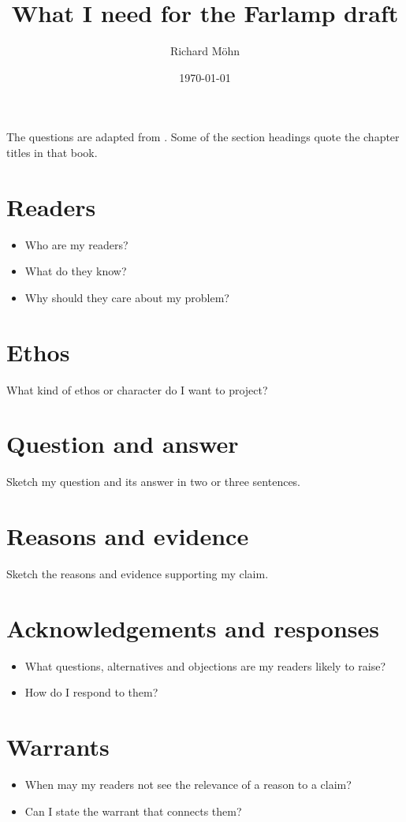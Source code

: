 \documentclass{farlamp}
\title{What I need for the Farlamp draft}
\author{Richard Möhn}
\date{\today}
\begin{document}
\maketitle

The questions are adapted from \textcite[p. 175]{CoR}. Some of the section
headings quote the chapter titles in that book.

\section{Readers}

\begin{itemize}
\item Who are my readers?
\item What do they know?
\item Why should they care about my problem?
\end{itemize}

\section{Ethos}

What kind of ethos or character do I want to project?

\section{Question and answer}

Sketch my question and its answer in two or three sentences.

\section{Reasons and evidence}

Sketch the reasons and evidence supporting my claim.

\section{Acknowledgements and responses}

\begin{itemize}
\item What questions, alternatives and objections are my readers likely to
    raise?
\item How do I respond to them?
\end{itemize}

\section{Warrants}

\begin{itemize}
\item When may my readers not see the relevance of a reason to a claim?
\item Can I state the warrant that connects them?
\end{itemize}


\begin{FlushLeft}
\printbibliography
\end{FlushLeft}
\end{document}
